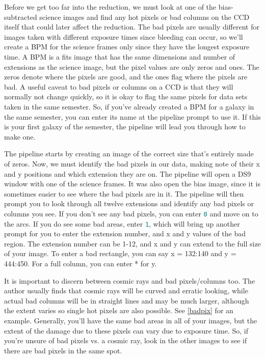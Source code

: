 \documentclass[12pt]{report}
\newcommand{\ty}[1]{\textcolor{teal}{\texttt{#1}}}
\begin{document}

\noindent Before we get too far into the reduction, we must look at one of the bias-subtracted science images and find any hot pixels or bad columns on the CCD itself that could later affect the reduction. The bad pixels are usually different for images taken with different exposure times since bleeding can occur, so we'll create a BPM for the science frames only since they have the longest exposure time. A BPM is a fits image that has the same dimensions and number of extensions as the science image, but the pixel values are only zeros and ones. The zeros denote where the pixels are good, and the ones flag where the pixels are bad. A useful caveat to bad pixels or columns on a CCD is that they will normally not change quickly, so it is okay to flag the same pixels for data sets taken in the same semester. So, if you've already created a BPM for a galaxy in the same semester, you can enter its name at the pipeline prompt to use it. If this is your first galaxy of the semester, the pipeline will lead you through how to make one.

The pipeline starts by creating an image of the correct size that's entirely made of zeros. Now, we must identify the bad pixels in our data, making note of their x and y positions and which extension they are on. The pipeline will open a DS9 window with one of the science frames. It was also open the bias image, since it is sometimes easier to see where the bad pixels are in it. The pipeline will then prompt you to look through all twelve extensions and identify any bad pixels or columns you see. If you don't see any bad pixels, you can enter \ty{0} and move on to the arcs. If you do see some bad areas, enter \ty{1}, which will bring up another prompt for you to enter the extension number, and x and y values of the bad region. The extension number can be 1-12, and x and y can extend to the full size of your image. To enter a bad rectangle, you can say x = 132:140 and y = 444:450. For a full column, you can enter * for y.

It is important to discern between cosmic rays and bad pixels/columns too. The author usually finds that cosmic rays will be curved and erratic looking, while actual bad columns will be in straight lines and may be much larger, although the extent varies so single hot pixels are also possible. See \autoref{badpix} for an example. Generally, you'll have the same bad areas in all of your images, but the extent of the damage due to these pixels can vary due to exposure time. So, if you're unsure of bad pixels vs. a cosmic ray, look in the other images to see if there are bad pixels in the same spot. 
\end{document}

